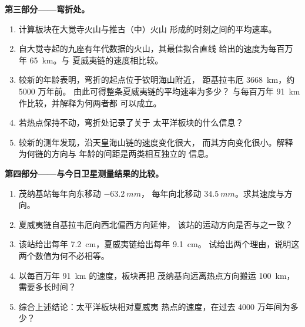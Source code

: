 \begin{problem}
\medskip
\noindent\textbf{第三部分——弯折处。}
\begin{enumerate}[resume]
  \item 计算板块在大觉寺火山与推古（中）火山
        形成的时刻之间的平均速率。
  \item 自大觉寺起的九座有年代数据的火山，其最佳拟合直线
        给出的速度为每百万年 \qty{65}{km}。与
        夏威夷链的速度相比较。
  \item 较新的年龄表明，弯折的起点位于钦明海山附近，
        距基拉韦厄 \qty{3668}{km}，约 5000 万年前。
        由此可得整条夏威夷链的平均速率为多少？
        与每百万年 \qty{91}{km} 作比较，并解释为何两者都
        可以成立。
  \item 若热点保持不动，弯折处记录了关于
        太平洋板块的什么信息？
  \item 较新的测年发现，沿天皇海山链的速度变化很大，
        而其方向变化很小。解释为何链的方向与
        年龄的间距是两类相互独立的
        信息。
\end{enumerate}

\medskip
\noindent\textbf{第四部分——与今日卫星测量结果的比较。}
\begin{enumerate}[resume]
  \item 茂纳基站每年向东移动 $\qty{-63.2}{mm}$，
        每年向北移动 $\qty{+34.5}{mm}$。求其速度与方向。
  \item 夏威夷链自基拉韦厄向西北偏西方向延伸，
        该站的运动方向是否与之一致？
  \item 该站给出每年 \qty{7.2}{cm}，夏威夷链给出每年 \qty{9.1}{cm}。
        试给出两个理由，说明这两个数值为何不必相等。
  \item 以每百万年 \qty{91}{km} 的速度，板块再把
        茂纳基向远离热点方向搬运 \qty{100}{km}，需要多长时间？
  \item 综合上述结论：太平洋板块相对夏威夷
        热点的速度，在过去 4000 万年间为多少？
\end{enumerate}
\end{problem}

